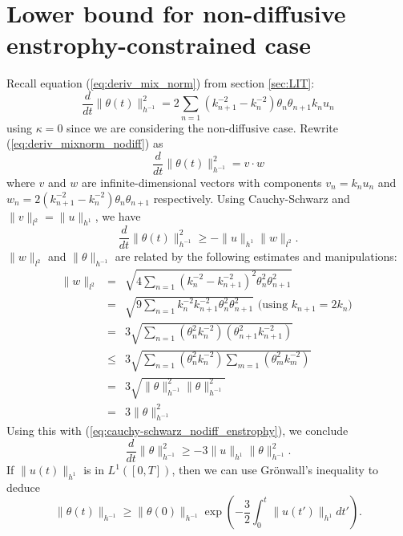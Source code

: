 

\section{Lower bound for non-diffusive enstrophy-constrained case}
\label{appendix:lower_bound_enstorphy_nodiff}
Recall equation (\ref{eq:deriv_mix_norm}) from section \ref{sec:LIT}:
\begin{equation}
	\label{eq:deriv_mixnorm_nodiff}
	\frac{d}{dt} \| \theta (t) \|^{2}_{h^{-1}} = 2 \sum_{n=1}  \left(k_{n+1}^{-2}-k_{n}^{-2}\right)\theta_{n}\theta_{n+1}k_{n}u_{n}
\end{equation}
using $\kappa =0$ since we are considering the non-diffusive case. Rewrite (\ref{eq:deriv_mixnorm_nodiff}) as
\begin{equation}
	\frac{d}{dt} \| \theta (t) \|^{2}_{h^{-1}} = v\cdot w
\end{equation}
where $v$ and $w$ are infinite-dimensional vectors with components $v_{n}=k_{n}u_{n}$ and $w_{n}= 2\left(k_{n+1}^{-2}-k_{n}^{-2}\right)\theta_{n}\theta_{n+1}$ respectively. Using Cauchy-Schwarz  and  $\|v\|_{l^{2}}=\|u\|_{h^{1}}$, we have
\begin{equation}
	\label{eq:cauchy-schwarz_nodiff_enstrophy}
	\frac{d}{dt} \| \theta (t) \|^{2}_{h^{-1}} \geq - \|u\|_{h^{1}}\| w\|_{l^{2}}.
\end{equation}
$\|w\|_{l^{2}}$ and $\|\theta\|_{h^{-1}}$ are related by the following estimates and manipulations:
\begin{eqnarray}
	\|w\|_{l^{2}} &=& \sqrt{4\sum_{n=1} (k^{-2}_{n}-k^{-2}_{n+1} )^{2}\theta_{n}^{2}\theta_{n+1}^{2}}\\
	&= & \sqrt{ 9\sum_{n=1}  k^{-2}_{n}k^{-2}_{n+1} \theta_{n}^{2}\theta_{n+1}^{2}}   \text{ (using $k_{n+1}=2 k_{n}$) }\\
	& = & 3\sqrt{ \sum_{n=1} ( \theta_{n}^{2}k_{n}^{-2}) ( \theta_{n+1}^{2}k_{n+1}^{-2})}  \\
	&\leq  & 3\sqrt{ \sum_{n=1} ( \theta_{n}^{2}k_{n}^{-2}) \sum_{m=1} ( \theta_{m}^{2}k_{m}^{-2})} \\
	&= & 3\sqrt{\|\theta\|_{h^{-1}}^2\|\theta\|_{h^{-1}}^2} \\
	&= & 3\|\theta\|_{h^{-1}}^2
\end{eqnarray}
Using this with (\ref{eq:cauchy-schwarz_nodiff_enstrophy}), we conclude
\begin{equation}
	\label{eq:enstrophy_bound}
	\frac{d}{dt} \| \theta  \|^{2}_{h^{-1}} \geq - 3\|u\|_{h^{1}}\|\theta\|_{h^{-1}}^2.
\end{equation}
If $\|u(t)\|_{h^{1}}$ is in $L^{1}([0,T])$, then we can use Gr\"{o}nwall's inequality to deduce
\begin{equation}
	\label{eq:bound_enstrophy_no_diff}
	\| \theta (t) \|_{h^{-1}} \geq \|\theta (0)\|_{h^{-1}} \exp \left( - \frac{3}{2}\int_{0}^{t}\|u(t')\|_{h^{1}} dt' \right).
\end{equation}


